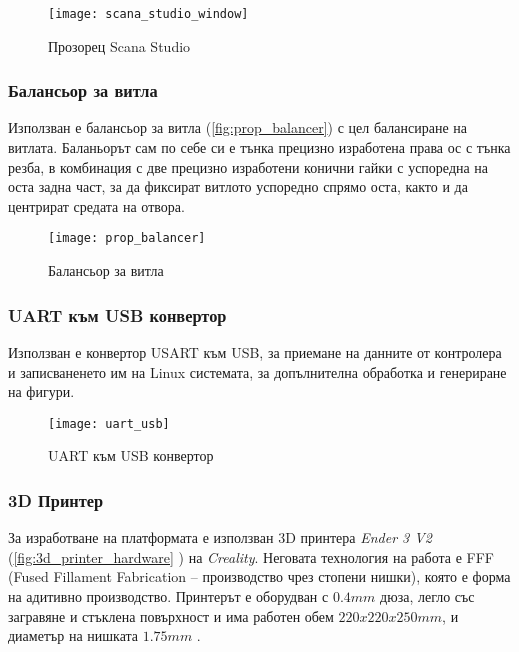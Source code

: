\begin{figure}[htpb!]
    \centering
    \texttt{[image: scana\_studio\_window]}
    \caption{Прозорец Scana Studio}
    \label{fig:scana_studio_window}
\end{figure}

\FloatBarrier


\subsubsection{Балансьор за витла}
\FloatBarrier


Използван е балансьор за витла (\autoref{fig:prop_balancer}) с цел балансиране на витлата.
Баланьорът сам по себе си е тънка прецизно изработена права ос с тънка резба, в комбинация с две прецизно изработени конични гайки с успоредна на оста задна част,
за да фиксират витлото успоредно спрямо оста, както и да центрират средата на отвора.
 
\begin{figure}[htpb!]
    \centering
    \texttt{[image: prop\_balancer]}
    \caption{Балансьор за витла}
    \label{fig:prop_balancer}
\end{figure}




\subsubsection{UART към USB конвертор}
\FloatBarrier


Използван е конвертор USART към USB, за приемане на данните от контролера и записваненето им
на Linux системата, за допълнителна обработка и генериране на фигури.

\begin{figure}[htpb!]
    \centering
    \texttt{[image: uart\_usb]}
    \caption{UART към USB конвертор}
    \label{fig:prop_balancer}
\end{figure}


\subsubsection{3D Принтер}
\FloatBarrier

За изработване на платформата е използван 3D принтера \textit{Ender 3 V2} (\autoref{fig:3d_printer_hardware} ) на \textit{Creality}.
Неговата технология на работа е FFF (Fused Fillament Fabrication -- производство чрез стопени нишки), която е форма на адитивно производство.
Принтерът е оборудван с \(0.4mm\) дюза,
легло със загравяне и стъклена повърхност
и има работен обем \(220x220x250mm\), 
и диаметър на нишката \(1.75mm\) \cite{user_manual_3d_printer}.


